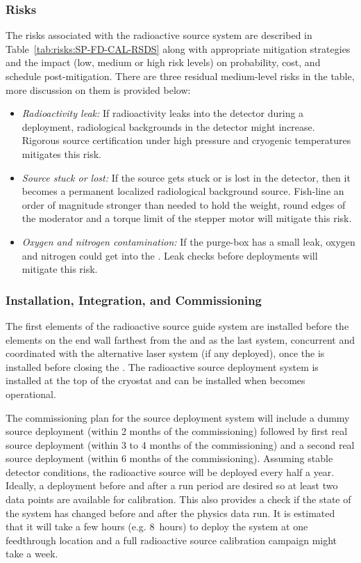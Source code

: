 \subsubsection{Risks}
The risks associated with the radioactive source system are described in Table~\ref{tab:risks:SP-FD-CAL-RSDS} along with appropriate mitigation strategies and the impact (low, medium or high risk levels) on probability, cost, and schedule post-mitigation. There are three residual medium-level risks in the table, more discussion on them is provided below:
\begin{itemize}
    \item \textit{Radioactivity leak:} If radioactivity leaks into the detector during a deployment, radiological backgrounds in the detector might increase. Rigorous source certification under high pressure and cryogenic temperatures mitigates this risk.
    \item \textit{Source stuck or lost:} If the source gets stuck or is lost in the detector, then it becomes a permanent localized radiological background source. Fish-line an order of magnitude stronger than needed to hold the weight, round edges of the moderator and a torque limit of the stepper motor will mitigate this risk.
    \item \textit{Oxygen and nitrogen contamination:} If the purge-box has a small leak, oxygen and nitrogen could get into the . Leak checks before deployments will mitigate this risk.
\end{itemize}





\subsubsection{Installation, Integration, and Commissioning}
The first elements of the radioactive source guide system are installed before the  elements on the end wall farthest from the  and as the last system, concurrent and coordinated with the alternative laser system (if any deployed), once the  is installed before closing the . The radioactive source deployment system is installed at the top of the cryostat and can be installed when  becomes operational.

The commissioning plan for the source deployment system will include a dummy source deployment (within \num{2} months of the commissioning) followed by first real source deployment (within \num{3} to \num{4} months of the commissioning) and a second real source deployment (within \num{6} months of the commissioning). Assuming stable detector conditions, the radioactive source will be deployed every half a year. Ideally, a deployment before and after a run period are desired so at least two data points are available for calibration. This also provides a check if the state of the system
has changed before and after the physics data run. 
It is estimated that it will take a few hours (e.g. \num{8}~hours) to deploy the system at one feedthrough location and a full radioactive source calibration campaign might take %
a week.

